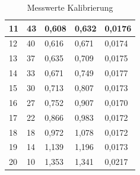 \documentclass[12pt, oneside, a4paper, \docLanguage]{report}
\begin{document}
\begin{table}[]
\begin{tabular}{|l|l|l|l|l|}
11           & 43                           & 0,608                     & 0,632                                   & 0,0176                                            \\ \hline
12           & 40                           & 0,616                     & 0,671                                   & 0,0174                                            \\ \hline
13           & 37                           & 0,635                     & 0,709                                   & 0,0175                                            \\ \hline
14           & 33                           & 0,671                     & 0,749                                   & 0,0177                                            \\ \hline
15           & 30                           & 0,713                     & 0,807                                   & 0,0173                                            \\ \hline
16           & 27                           & 0,752                     & 0,907                                   & 0,0170                                            \\ \hline
17           & 22                           & 0,866                     & 0,983                                   & 0,0172                                            \\ \hline
18           & 18                           & 0,972                     & 1,078                                   & 0,0172                                            \\ \hline
19           & 14                           & 1,139                     & 1,196                                   & 0,0173                                            \\ \hline
20           & 10                           & 1,353                     & 1,341                                   & 0,0217                                            \\ \hline                           
\end{tabular}
\caption{Messwerte Kalibrierung}
\label{fig:VERSUCH_1_MESSWERTE_TABELLE}
\end{table}
\end{document}
